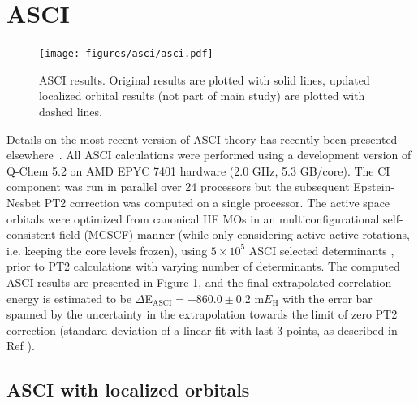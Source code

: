\documentclass[journal=jcp,manuscript=suppinfo]{achemso}
\begin{document}
\section{ASCI}
\label{sec:asci}
%
\begin{figure}[ht!]
\begin{center}
\texttt{[image: figures/asci/asci.pdf]}
\caption{ASCI results. Original results are plotted with solid lines, updated localized orbital results (not part of main study) are plotted with dashed lines.}
\label{asci_SI_fig}
\end{center}
\vspace{-0.6cm}
\end{figure}
%
Details on the most recent version of ASCI theory has recently been presented elsewhere~\cite{tubman_whaley_selected_ci_jctc_2020,tubman_whaley_selected_ci_pt_arxiv_2018}. 
All ASCI calculations were performed using a development version of Q-Chem 5.2\cite{shao2015advances}  on AMD EPYC 7401 hardware (2.0 GHz, 5.3 GB/core). The CI component was run in parallel over 24 processors but the subsequent Epstein-Nesbet PT2 correction was computed on a single processor. The active space orbitals were optimized from canonical HF MOs in an multiconfigurational self-consistent field (MCSCF) manner (while only considering active-active rotations, i.e. keeping the core levels frozen), using $5\times 10^5$ ASCI selected determinants  \cite{levine2020casscf}, prior to PT2 calculations with varying number of determinants. The computed ASCI results are presented in  Figure \ref{asci_SI_fig}, and the final extrapolated correlation energy is estimated to be $\Delta$E$_\textrm{ASCI} = -860.0 \pm 0.2$ m$E_{\text{H}}$ with the error bar spanned by the uncertainty in the extrapolation towards the limit of zero PT2 correction (standard deviation of a linear fit with last 3 points, as described in Ref ).

\subsection{ASCI with localized orbitals}\label{sec:asciloc}
\end{document}
